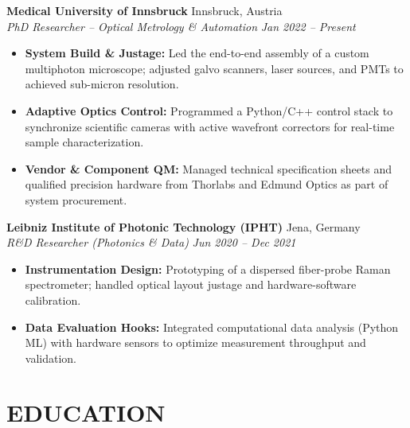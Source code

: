 \documentclass[a4paper,10pt]{article}
\newcommand{\entry}[4]{
  \textbf{#1} \hfill #2 \\
  \textit{#3} \hfill \textit{#4} \\
}
\begin{document}
\vspace{10pt}

\entry{Medical University of Innsbruck}{Innsbruck, Austria}{PhD Researcher – Optical Metrology \& Automation}{Jan 2022 -- Present}
\begin{itemize}[leftmargin=*, topsep=2pt, itemsep=1pt, parsep=1pt]
    
    \item \textbf{System Build \& Justage:} Led the end-to-end assembly of a custom multiphoton microscope; adjusted galvo scanners, laser sources, and PMTs to achieved sub-micron resolution.
    
    \item \textbf{Adaptive Optics Control:} Programmed a Python/C++ control stack to synchronize scientific cameras with active wavefront correctors for real-time sample characterization.
    
    \item \textbf{Vendor \& Component QM:} Managed technical specification sheets and qualified precision hardware from Thorlabs and Edmund Optics as part of system procurement.
    
\end{itemize}

\vspace{10pt}

\entry{Leibniz Institute of Photonic Technology (IPHT)}{Jena, Germany}{R\&D Researcher (Photonics \& Data)}{Jun 2020 -- Dec 2021}
\begin{itemize}[leftmargin=*, topsep=2pt, itemsep=1pt, parsep=1pt]
    
    \item \textbf{Instrumentation Design:} Prototyping of a dispersed fiber-probe Raman spectrometer; handled optical layout justage and hardware-software calibration.
    
    \item \textbf{Data Evaluation Hooks:} Integrated computational data analysis (Python ML) with hardware sensors to optimize measurement throughput and validation.
    
\end{itemize}

\vspace{10pt}


\section{EDUCATION}
\end{document}
